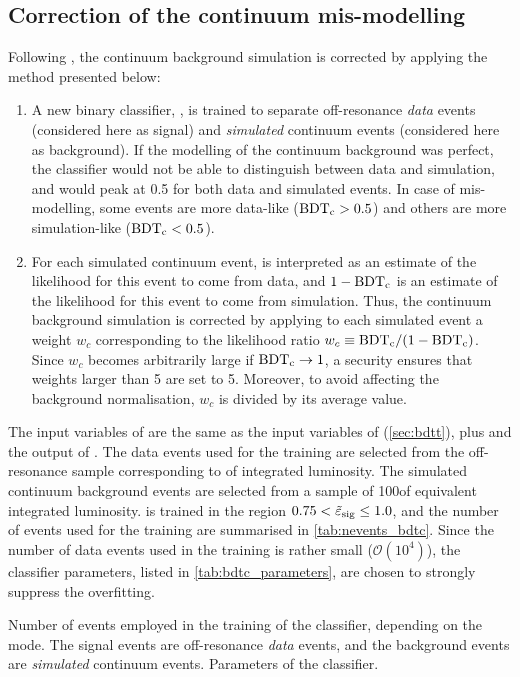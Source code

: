\subsection{Correction of the continuum mis-modelling} \label{sec:bdtc}
Following \cite{Martschei2012}, the continuum background simulation is corrected by applying the method presented below:
\begin{enumerate}
\item A new binary classifier, \bdtc, is trained to separate off-resonance \emph{data} events (considered here as signal) and \emph{simulated} continuum events (considered here as background).
If the modelling of the continuum background was perfect, the classifier would not be able to distinguish between data and simulation, and \bdtc would peak at 0.5 for both data and simulated events.
In case of mis-modelling, some events are more data-like ($\mathrm{BDT_c}>0.5$) and others are more simulation-like ($\mathrm{BDT_c}<0.5$).
\item For each simulated continuum event, \bdtc is interpreted as an estimate of the likelihood for this event to come from data, and $1-\mathrm{BDT_c}$ is an estimate of the likelihood for this event to come from simulation.
Thus, the continuum background simulation is corrected by applying to each simulated event a weight $w_c$ corresponding to the likelihood ratio $w_c\equiv\mathrm{BDT_c}/(1-\mathrm{BDT_c})$.
Since $w_c$ becomes arbitrarily large if $\mathrm{BDT_c}\rightarrow 1$, a security ensures that weights larger than 5 are set to 5.
Moreover, to avoid affecting the background normalisation, $w_c$ is divided by its average value.
\end{enumerate}
The input variables of \bdtc are the same as the input variables of \bdtt (\cref{sec:bdtt}), plus \qrec and the output of \bdtt.
The data events used for the \bdtc training are selected from the off-resonance sample corresponding to \lumioff of integrated luminosity.
The simulated continuum background events are selected from a sample of 100\invfb of equivalent integrated luminosity.
\bdtc is trained in the region $0.75<\tilde{\varepsilon}_{\mathrm{sig}}\le1.0$, and the number of events used for the training are summarised in \cref{tab:nevents_bdtc}.
Since the number of data events used in the training is rather small ($\mathcal{O}(10^4)$), the classifier parameters, listed in \cref{tab:bdtc_parameters}, are chosen to strongly suppress the overfitting.

{Number of events employed in the training of the \bdtc classifier, depending on the mode.
The signal events are off-resonance \emph{data} events, and the background events are \emph{simulated} continuum events.}
{Parameters of the \bdtc classifier.}

